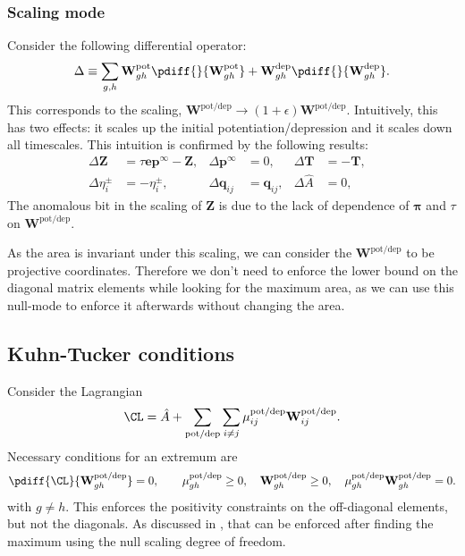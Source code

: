 \documentclass{article} %
\newcommand{\onev}{\mathbf{e}}
\newcommand{\pr}{\mathbf{p}}
\newcommand{\eq}{\pr^\infty}
\newcommand{\fpt}{\mathbf{T}}
\newcommand{\fund}{\mathbf{Z}}
\newcommand{\pib}{\boldsymbol{\pi}}
\newcommand{\w}{\mathbf{w}}
\newcommand{\W}{\mathbf{W}}
\newcommand{\enc}{\mathbf{q}}
\newcommand{\pot}{^{\text{pot}}}
\newcommand{\dep}{^{\text{dep}}}
\newcommand{\potdep}{^{\text{pot/dep}}}
\begin{document}
\subsubsection{Scaling mode}\label{sec:rescale}

Consider the following differential operator:
%
\begin{equation}\label{eq:scaleop}
  \Delta \equiv \sum_{g,h} \W\pot _{gh}\pdiff{}{\W\pot _{gh}} + \W\dep _{gh}\pdiff{}{\W\dep _{gh}}.
\end{equation}
%
This corresponds to the scaling, $\W\potdep  \to (1+\epsilon)\W\potdep $.
Intuitively, this has two effects: it scales up the initial potentiation/depression and it scales down all timescales.
This intuition is confirmed by the following results:
%
\begin{equation}\label{eq:scaleeffects}
  \begin{aligned}
    \Delta \fund &= \tau\onev\eq - \fund ,&
    \Delta \eq  &= 0 ,&
    \Delta \fpt  &= -\fpt ,
    \\
    \Delta \eta^\pm_i  &= - \eta^\pm_i ,&
    \Delta \enc_{ij} &= \enc_{ij} ,&
    \Delta \hat{A}  &= 0 ,&
  \end{aligned}
\end{equation}
%
The anomalous bit in the scaling of $\fund$ is due to the lack of dependence of $\pib$ and $\tau$ on $\W\potdep $.

As the area is invariant under this scaling, we can consider the $\W\potdep $ to be projective coordinates.
Therefore we don't need to enforce the lower bound on the diagonal matrix elements while looking for the maximum area, as we can use this null-mode to enforce it afterwards without changing the area.

\subsection{Kuhn-Tucker conditions}\label{sec:kuhntucker}

Consider the Lagrangian
%
\begin{equation}\label{eq:lagrangian}
  \CL = \hat{A} + \sum_{\text{pot/dep}}\sum_{i\neq j} \mu\potdep _{ij} \W\potdep _{ij} .%
\end{equation}
%
Necessary conditions for an extremum are
%
\begin{equation}\label{eq:extremum}
  \pdiff{\CL}{\W\potdep _{gh}} = 0,
  \qquad
    \mu\potdep _{gh} \geq 0,\quad
    \W\potdep _{gh} \geq 0,\quad
    \mu\potdep _{gh}\W\potdep _{gh} = 0.
\end{equation}
%
with $g \neq h$. This enforces the positivity constraints on the off-diagonal elements, but not the diagonals. As discussed in , that can be enforced after finding the maximum using the null scaling degree of freedom.
\end{document}
